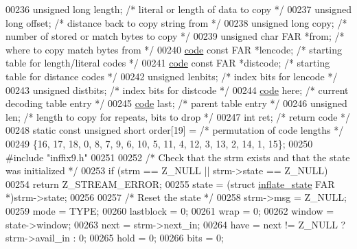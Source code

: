 \begin{DoxyCode}
{{{{00236     \textcolor{keywordtype}{unsigned} \textcolor{keywordtype}{long} length;       \textcolor{comment}{/* literal or length of data to copy */}
00237     \textcolor{keywordtype}{unsigned} \textcolor{keywordtype}{long} offset;       \textcolor{comment}{/* distance back to copy string from */}
00238     \textcolor{keywordtype}{unsigned} \textcolor{keywordtype}{long} copy;         \textcolor{comment}{/* number of stored or match bytes to copy */}
00239     \textcolor{keywordtype}{unsigned} \textcolor{keywordtype}{char} FAR *from;    \textcolor{comment}{/* where to copy match bytes from */}
00240     \hyperlink{structcode}{code} \textcolor{keyword}{const} FAR *lencode;    \textcolor{comment}{/* starting table for length/literal codes */}
00241     \hyperlink{structcode}{code} \textcolor{keyword}{const} FAR *distcode;   \textcolor{comment}{/* starting table for distance codes */}
00242     \textcolor{keywordtype}{unsigned} lenbits;           \textcolor{comment}{/* index bits for lencode */}
00243     \textcolor{keywordtype}{unsigned} distbits;          \textcolor{comment}{/* index bits for distcode */}
00244     \hyperlink{structcode}{code} here;                  \textcolor{comment}{/* current decoding table entry */}
00245     \hyperlink{structcode}{code} last;                  \textcolor{comment}{/* parent table entry */}
00246     \textcolor{keywordtype}{unsigned} len;               \textcolor{comment}{/* length to copy for repeats, bits to drop */}
00247     \textcolor{keywordtype}{int} ret;                    \textcolor{comment}{/* return code */}
00248     \textcolor{keyword}{static} \textcolor{keyword}{const} \textcolor{keywordtype}{unsigned} \textcolor{keywordtype}{short} order[19] = \textcolor{comment}{/* permutation of code lengths */}
00249         \{16, 17, 18, 0, 8, 7, 9, 6, 10, 5, 11, 4, 12, 3, 13, 2, 14, 1, 15\};
00250 \textcolor{preprocessor}{#include "inffix9.h"}
00251 
00252     \textcolor{comment}{/* Check that the strm exists and that the state was initialized */}
00253     \textcolor{keywordflow}{if} (strm == Z\_NULL || strm->state == Z\_NULL)
00254         \textcolor{keywordflow}{return} Z\_STREAM\_ERROR;
00255     state = (\textcolor{keyword}{struct }\hyperlink{structinflate__state}{inflate\_state} FAR *)strm->state;
00256 
00257     \textcolor{comment}{/* Reset the state */}
00258     strm->msg = Z\_NULL;
00259     mode = TYPE;
00260     lastblock = 0;
00261     wrap = 0;
00262     window = state->window;
00263     next = strm->next\_in;
00264     have = next != Z\_NULL ? strm->avail\_in : 0;
00265     hold = 0;
00266     bits = 0;
}}}}
\end{DoxyCode}
